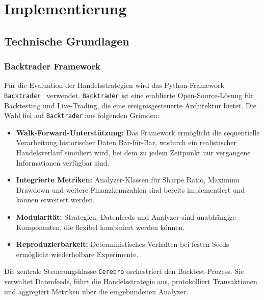 \chapter{Implementierung}\label{chap:implementierung}

\section{Technische Grundlagen}\label{sec:tech_grundlagen}

\subsection{Backtrader Framework}\label{subsec:backtrader}
Für die Evaluation der Handelsstrategien wird das Python-Framework \texttt{Backtrader}~\cite{backtrader} verwendet. \texttt{Backtrader} ist eine etablierte Open-Source-Lösung für Backtesting und Live-Trading, die eine ereignisgesteuerte Architektur bietet. Die Wahl fiel auf \texttt{Backtrader} aus folgenden Gründen:

\begin{itemize}
    \item \textbf{Walk-Forward-Unterstützung:} Das Framework ermöglicht die sequentielle Verarbeitung historischer Daten Bar-für-Bar, wodurch ein realistischer Handelsverlauf simuliert wird, bei dem zu jedem Zeitpunkt nur vergangene Informationen verfügbar sind.
    \item \textbf{Integrierte Metriken:} Analyzer-Klassen für Sharpe Ratio, Maximum Drawdown und weitere Finanzkennzahlen sind bereits implementiert und können erweitert werden.
    \item \textbf{Modularität:} Strategien, Datenfeeds und Analyzer sind unabhängige Komponenten, die flexibel kombiniert werden können.
    \item \textbf{Reproduzierbarkeit:} Deterministisches Verhalten bei festen Seeds ermöglicht wiederholbare Experimente.
\end{itemize}

Die zentrale Steuerungsklasse \texttt{Cerebro} orchestriert den Backtest-Prozess. Sie verwaltet Datenfeeds, führt die Handelsstrategie aus, protokolliert Transaktionen und aggregiert Metriken über die eingebundenen Analyzer.

